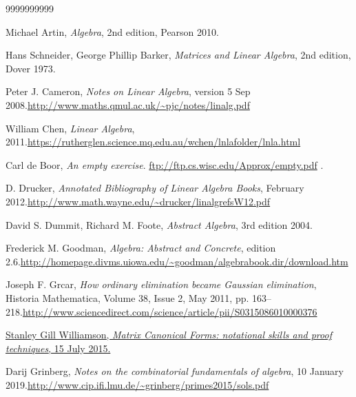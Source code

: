 \documentclass[numbers=enddot,12pt,final,onecolumn,notitlepage]{scrartcl}%
\theoremstyle{definition}
\begin{document}
\begin{thebibliography}{9999999999}                                                                                       %


Michael Artin, \textit{Algebra}, 2nd edition,
Pearson 2010.

Hans Schneider, George Phillip Barker,
\textit{Matrices and Linear Algebra}, 2nd edition, Dover 1973.

Peter J. Cameron, \textit{Notes on Linear
Algebra}, version 5 Sep 2008.\newline\url{http://www.maths.qmul.ac.uk/~pjc/notes/linalg.pdf}

William Chen, \textit{Linear Algebra}, 2011.\newline\url{https://rutherglen.science.mq.edu.au/wchen/lnlafolder/lnla.html}

Carl de Boor, \textit{An empty exercise}.
\url{ftp://ftp.cs.wisc.edu/Approx/empty.pdf} .

D. Drucker, \textit{Annotated Bibliography of
Linear Algebra Books}, February 2012.\newline\url{http://www.math.wayne.edu/~drucker/linalgrefsW12.pdf}

David S. Dummit, Richard M. Foote,
\textit{Abstract Algebra}, 3rd edition 2004.

Frederick M. Goodman, \textit{Algebra: Abstract
and Concrete}, edition 2.6.\newline\url{http://homepage.divms.uiowa.edu/~goodman/algebrabook.dir/download.htm}

Joseph F. Grcar, \textit{How ordinary elimination
became Gaussian elimination}, Historia Mathematica, Volume 38, Issue 2, May
2011, pp. 163--218.\newline\url{http://www.sciencedirect.com/science/article/pii/S0315086010000376}

%
\href{http://cseweb.ucsd.edu/~gill/CILASite/Resources/LinearAlgebra.pdf}{Stanley
Gill Williamson, \textit{Matrix Canonical Forms: notational skills and proof
techniques}, 15 July 2015.}

Darij Grinberg, \textit{Notes on the combinatorial
fundamentals of algebra}, 10 January 2019.\newline\url{http://www.cip.ifi.lmu.de/~grinberg/primes2015/sols.pdf}


\end{thebibliography}
\end{document}
